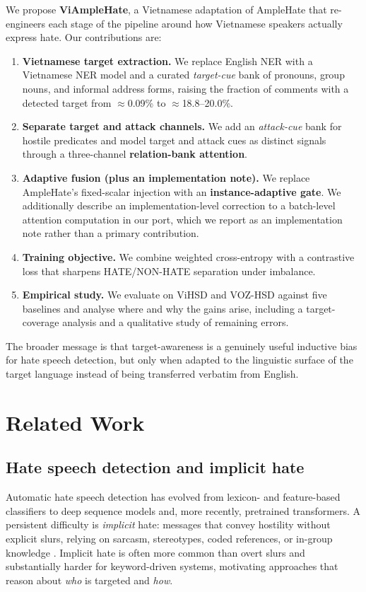 \documentclass[11pt]{article}
\begin{document}
We propose \textbf{ViAmpleHate}, a Vietnamese adaptation of AmpleHate that re-engineers each stage of the pipeline around how Vietnamese speakers actually express hate. Our contributions are:
\begin{enumerate}
  \item \textbf{Vietnamese target extraction.} We replace English NER with a Vietnamese NER model and a curated \emph{target-cue} bank of pronouns, group nouns, and informal address forms, raising the fraction of comments with a detected target from $\approx$0.09\% to $\approx$18.8--20.0\%.
  \item \textbf{Separate target and attack channels.} We add an \emph{attack-cue} bank for hostile predicates and model target and attack cues as distinct signals through a three-channel \textbf{relation-bank attention}.
  \item \textbf{Adaptive fusion (plus an implementation note).} We replace AmpleHate's fixed-scalar injection with an \textbf{instance-adaptive gate}. We additionally describe an implementation-level correction to a batch-level attention computation in our port, which we report as an implementation note rather than a primary contribution.
  \item \textbf{Training objective.} We combine weighted cross-entropy with a contrastive loss that sharpens HATE/NON-HATE separation under imbalance.
  \item \textbf{Empirical study.} We evaluate on ViHSD and VOZ-HSD against five baselines and analyse where and why the gains arise, including a target-coverage analysis and a qualitative study of remaining errors.
\end{enumerate}
The broader message is that target-awareness is a genuinely useful inductive bias for hate speech detection, but only when adapted to the linguistic surface of the target language instead of being transferred verbatim from English.

\section{Related Work}

\subsection{Hate speech detection and implicit hate}
Automatic hate speech detection has evolved from lexicon- and feature-based classifiers \citep{davidson2017,schmidt2017survey} to deep sequence models and, more recently, pretrained transformers. A persistent difficulty is \emph{implicit} hate: messages that convey hostility without explicit slurs, relying on sarcasm, stereotypes, coded references, or in-group knowledge \citep{elsherief2021latent}. Implicit hate is often more common than overt slurs and substantially harder for keyword-driven systems, motivating approaches that reason about \emph{who} is targeted and \emph{how}.
\end{document}
